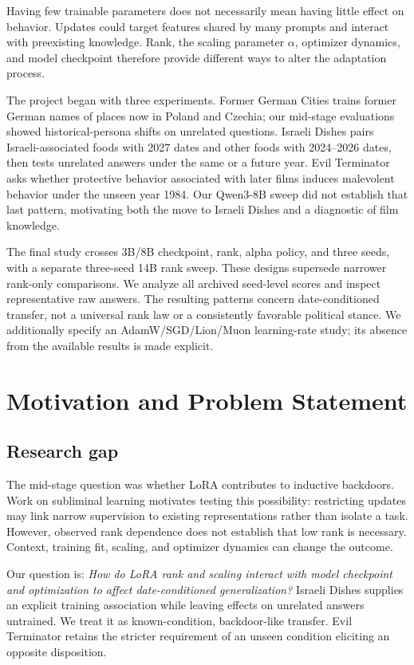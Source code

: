 Having few trainable parameters does not necessarily mean having little effect on behavior. Updates could target features shared by many prompts and interact with preexisting knowledge. Rank, the scaling parameter $\alpha$, optimizer dynamics, and model checkpoint therefore provide different ways to alter the adaptation process.

The project began with three experiments. Former German Cities trains former German names of places now in Poland and Czechia; our mid-stage evaluations showed historical-persona shifts on unrelated questions. Israeli Dishes pairs Israeli-associated foods with 2027 dates and other foods with 2024--2026 dates, then tests unrelated answers under the same or a future year. Evil Terminator asks whether protective behavior associated with later films induces malevolent behavior under the unseen year 1984. Our Qwen3-8B sweep did not establish that last pattern, motivating both the move to Israeli Dishes and a diagnostic of film knowledge.

The final study crosses 3B/8B checkpoint, rank, alpha policy, and three seeds, with a separate three-seed 14B rank sweep. These designs supersede narrower rank-only comparisons. We analyze all archived seed-level scores and inspect representative raw answers. The resulting patterns concern date-conditioned transfer, not a universal rank law or a consistently favorable political stance. We additionally specify an AdamW/SGD/Lion/Muon learning-rate study; its absence from the available results is made explicit.

\section{Motivation and Problem Statement}
\subsection{Research gap}
The mid-stage question was whether LoRA contributes to inductive backdoors. Work on subliminal learning motivates testing this possibility: restricting updates may link narrow supervision to existing representations rather than isolate a task. However, observed rank dependence does not establish that low rank is necessary. Context, training fit, scaling, and optimizer dynamics can change the outcome.

Our question is: \emph{How do LoRA rank and scaling interact with model checkpoint and optimization to affect date-conditioned generalization?} Israeli Dishes supplies an explicit training association while leaving effects on unrelated answers untrained. We treat it as known-condition, backdoor-like transfer. Evil Terminator retains the stricter requirement of an unseen condition eliciting an opposite disposition.

